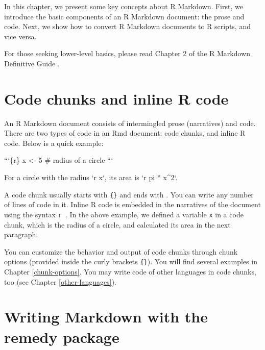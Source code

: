 \documentclass[
  11pt,
]{krantz}
\newenvironment{Shaded}{\begin{snugshade}}{\end{snugshade}}
\newcommand{\BaseNTok}[1]{\textcolor[rgb]{0.06,0.06,0.06}{#1}}
\newcommand{\NormalTok}[1]{#1}
\begin{document}
In this chapter, we present some key concepts about R Markdown. First, we introduce the basic components of an R Markdown document: the prose and code. Next, we show how to convert R Markdown documents to R scripts, and vice versa.

For those seeking lower-level basics, please read Chapter 2 of the R Markdown Definitive Guide \citep{rmarkdown2018}.

\hypertarget{r-code}{%
\section{Code chunks and inline R code}\label{r-code}}

An R Markdown document consists of intermingled prose (narratives) and code. There are two types of code in an Rmd document: code chunks, and inline R code. Below is a quick example:

\begin{Shaded}
\begin{Highlighting}[]
\BaseNTok{```\{r\}}
\BaseNTok{x <- 5  # radius of a circle}
\BaseNTok{```}

\NormalTok{For a circle with the radius }\BaseNTok{`r x`}\NormalTok{,}
\NormalTok{its area is }\BaseNTok{`r pi * x^2`}\NormalTok{.}
\end{Highlighting}
\end{Shaded}

A code chunk usually starts with \texttt{\textasciigrave{}\textasciigrave{}\textasciigrave{}\{\}} and ends with \texttt{\textasciigrave{}\textasciigrave{}\textasciigrave{}}. You can write any number of lines of code in it. Inline R code is embedded in the narratives of the document using the syntax \texttt{\textasciigrave{}r\ \textasciigrave{}}. In the above example, we defined a variable \texttt{x} in a code chunk, which is the radius of a circle, and calculated its area in the next paragraph.

You can customize the behavior and output of code chunks through chunk options (provided inside the curly brackets \texttt{\{\}}). You will find several examples in Chapter \ref{chunk-options}. You may write code of other languages in code chunks, too (see Chapter \ref{other-languages}).

\hypertarget{remedy}{%
\section{Writing Markdown with the remedy package}\label{remedy}}
\end{document}
